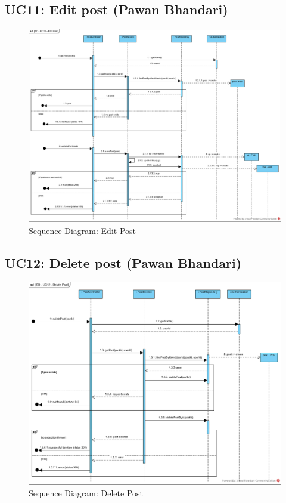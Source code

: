 \documentclass{article}
\begin{document}
\subsection{UC11: Edit post (Pawan Bhandari)}
\begin{figure}[H]
    \centering
    \includegraphics[width=.9\textwidth]{images/SD-UC11-EditPost.png}
    \centering
    \caption{Sequence Diagram: Edit Post}
\end{figure}
\subsection{UC12: Delete post (Pawan Bhandari)}
\begin{figure}[H]
    \centering
    \includegraphics[width=.9\textwidth]{images/SD-UC12-DeletePost.png}
    \centering
    \caption{Sequence Diagram: Delete Post}
\end{figure}
\end{document}
